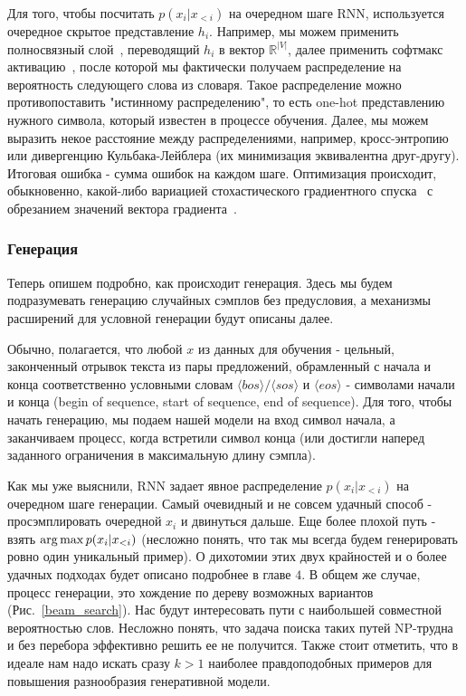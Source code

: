 \documentclass{spbau-diploma}
\begin{document}
Для того, чтобы посчитать $p(x_i|x_{<i})$ на очередном шаге RNN, используется 
очередное скрытое представление $h_i$. Например, мы можем применить полносвязный
слой~\cite{cnn}, переводящий $h_i$ в вектор $\mathbb{R}^{|V|}$, далее применить 
софтмакс активацию~\cite{wiki:softmax}, после которой мы фактически получаем 
распределение на вероятность следующего слова из словаря. 
Такое распределение можно 
противопоставить "истинному распределению", то есть one-hot представлению 
нужного символа, который известен в процессе обучения. 
Далее, мы можем выразить некое 
расстояние между распределениями, например, кросс-энтропию или дивергенцию 
Кульбака-Лейблера (их минимизация эквивалентна друг-другу). Итоговая ошибка - 
сумма ошибок на каждом шаге. Оптимизация происходит, обыкновенно, какой-либо 
вариацией стохастического градиентного спуска~\cite{optimizers} с обрезанием 
значений вектора градиента~\cite{gradient_clipping}.

\subsubsection{Генерация}
Теперь опишем подробно, как происходит генерация. Здесь мы будем 
подразумевать генерацию случайных сэмплов без предусловия, а механизмы 
расширений для условной генерации будут описаны далее.

\newcommand{\bos}{\langle bos \rangle}
\newcommand{\sos}{\langle sos \rangle}
\newcommand{\eos}{\langle eos \rangle}
\newcommand{\unk}{\langle unk \rangle}
\newcommand{\pad}{\langle pad \rangle}
Обычно, полагается, что любой $x$ из данных для обучения - цельный, законченный 
отрывок текста из пары предложений, обрамленный с начала и конца соответственно 
условными словам $\bos/\sos$ и $\eos$ - символами начали и конца (begin of 
sequence, start of sequence, end of sequence). Для того, чтобы начать генерацию, 
мы подаем нашей модели на вход символ начала, а заканчиваем процесс, когда 
встретили символ конца (или достигли наперед заданного ограничения в 
максимальную длину сэмпла).

Как мы уже выяснили, RNN задает явное распределение $p(x_i|x_{<i})$ на очередном
шаге генерации. Самый очевидный и не совсем удачный способ - просэмплировать
очередной $x_i$ и двинуться дальше. Еще более плохой путь - взять 
$\operatorname*{arg\,max} p(x_i|x_{<i})$ (несложно понять, что так мы всегда будем 
генерировать ровно один уникальный пример). О дихотомии этих двух крайностей и 
о более удачных подходах будет описано подробнее в главе $4$. В общем же 
случае, процесс генерации, это хождение по дереву возможных вариантов
(Рис.~\ref{beam_search}). Нас будут интересовать пути с наибольшей совместной 
вероятностью слов. Несложно понять, что задача поиска таких путей NP-трудна и 
без перебора эффективно решить ее не получится. Также стоит отметить, что в 
идеале нам надо искать сразу $k > 1$ наиболее правдоподобных примеров для 
повышения разнообразия генеративной модели.
\end{document}
